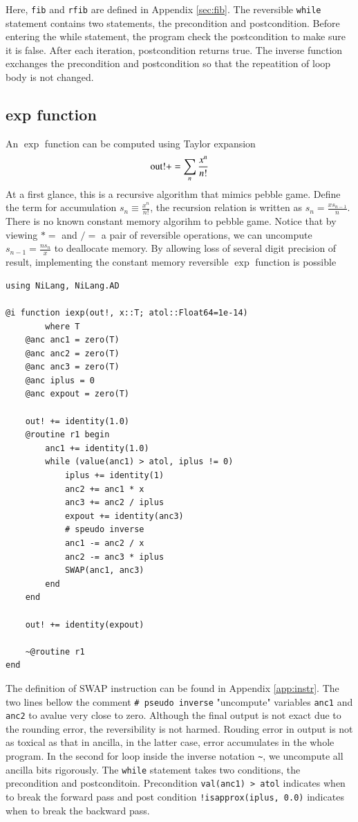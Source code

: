 \documentclass[aps,twocolumn,longbibliography,english,superscriptaddress,prr]{revtex4-1}
\newcommand{\<}{\langle}
\renewcommand{\>}{\rangle}
\newcommand{\App}[1]{Appendix \ref{#1}}
\theoremstyle{definition}\newtheorem{definition}{\textit{Definition}}
\begin{document}
Here, \texttt{fib} and \texttt{rfib} are defined in \App{sec:fib}.
The reversible \texttt{while} statement contains two statements, the precondition and postcondition.
Before entering the while statement, the program check the postcondition to make sure it is false.
After each iteration, postcondition returns true. The inverse function exchanges the precondition and postcondition so that the repeatition of loop body is not changed.

\subsection{exp function}
An $\exp$ function can be computed using Taylor expansion
\begin{equation}
    {\rm out!} += \sum\limits_n \frac{x^n}{n!}
\end{equation}
At a first glance, this is a recursive algorithm that mimics pebble game.
Define the term for accumulation $s_n \equiv \frac{x^n}{n!}$, the recursion relation is written as $s_n = \frac{x s_{n-1}}{n}$.
There is no known constant memory algorihm to pebble game.
Notice that by viewing $*=$ and $/=$ a pair of reversible operations, we can uncompute $s_{n-1} = \frac{n s_n}{x}$ to deallocate memory.
By allowing loss of several digit precision of result, implementing the constant memory reversible $\exp$ function is possible

\begin{minipage}{.44\textwidth}
\begin{lstlisting}
using NiLang, NiLang.AD

@i function iexp(out!, x::T; atol::Float64=1e-14)
        where T
    @anc anc1 = zero(T)
    @anc anc2 = zero(T)
    @anc anc3 = zero(T)
    @anc iplus = 0
    @anc expout = zero(T)

    out! += identity(1.0)
    @routine r1 begin
        anc1 += identity(1.0)
        while (value(anc1) > atol, iplus != 0)
            iplus += identity(1)
            anc2 += anc1 * x
            anc3 += anc2 / iplus
            expout += identity(anc3)
            # speudo inverse
            anc1 -= anc2 / x
            anc2 -= anc3 * iplus
            SWAP(anc1, anc3)
        end
    end

    out! += identity(expout)

    ~@routine r1
end
\end{lstlisting}
\end{minipage}

The definition of SWAP instruction can be found in \App{app:instr}.
The two lines bellow the comment \texttt{\# pseudo inverse} "uncompute" variables \texttt{anc1} and \texttt{anc2} to avalue very close to zero.
Although the final output is not exact due to the rounding error, the reversibility is not harmed.
Rouding error in output is not as toxical as that in ancilla, in the latter case, error accumulates in the whole program.
In the second for loop inside the inverse notation \texttt{\~}, we uncompute all ancilla bits rigorously.
The \texttt{while} statement takes two conditions, the precondition and postconditoin. Precondition \texttt{val(anc1) > atol} indicates when to break the forward pass and post condition \texttt{!isapprox(iplus, 0.0)} indicates when to break the backward pass.
\end{document}

